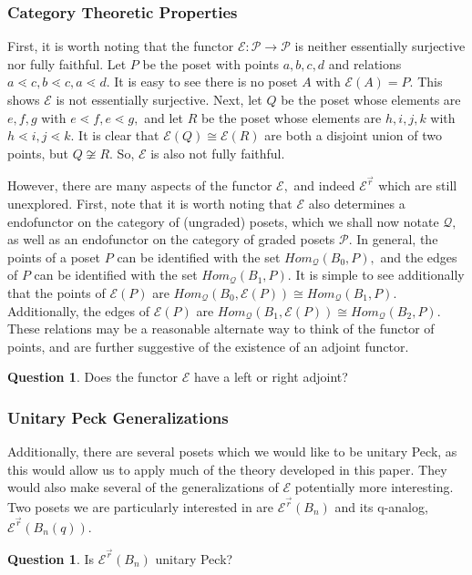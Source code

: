 \documentclass[10 pt]{amsart}
\theoremstyle{plain}
\theoremstyle{definition}
\newtheorem{question}[thm]{Question}
\theoremstyle{remark}
\numberwithin{equation}{section}
\newcommand\sssec{\subsubsection}
\renewcommand{\vec}[1]{\overrightarrow{#1}}
\begin{document}
\sssec{Category Theoretic Properties}

First, it is worth noting that the functor $\mathcal E:\mathcal P \rightarrow \mathcal P$ is neither essentially surjective nor fully faithful. Let $P$ be the poset with points $a,b,c,d$ and relations $a \lessdot c, b \lessdot c, a \lessdot d.$ It is easy to see there is no poset $A$ with $\mathcal E(A) = P.$ This shows $\mathcal E$ is not essentially surjective. Next, let $Q$ be the poset whose elements are $e,f,g$ with $e \lessdot f, e \lessdot g,$ and let $R$ be the poset whose elements are $h,i,j,k$ with $h \lessdot i, j \lessdot k.$ It is clear that $\mathcal E(Q) \cong \mathcal E(R)$ are both a disjoint union of two points, but $Q \not \cong R.$ So, $\mathcal E$ is also not fully faithful.

However, there are many aspects of the functor $\mathcal E,$ and indeed $\mathcal E^{\vec r}$ which are still unexplored. First, note that it is worth noting that $\mathcal E$ also determines a endofunctor on the category of (ungraded) posets, which we shall now notate $\mathcal Q,$ as well as an endofunctor on the category of graded posets $\mathcal P.$ In general, the points of a poset $P$ can be identified with the set $Hom_{\mathcal Q}(B_0,P),$ and the edges of $P$ can be identified with the set $Hom_{\mathcal Q}(B_1,P).$ It is simple to see additionally that the points of $\mathcal E(P)$ are $Hom_{\mathcal Q}(B_0,\mathcal E(P)) \cong Hom_{\mathcal Q}(B_1,P).$ Additionally, the edges of $\mathcal E(P)$ are $Hom_{\mathcal Q}(B_1,\mathcal E(P)) \cong Hom_{\mathcal Q}(B_2,P).$ These relations may be a reasonable alternate way to think of the functor of points, and are further suggestive of the existence of an adjoint functor.

\begin{question}
Does the functor $\mathcal E$ have a left or right adjoint?
\end{question}

\sssec{Unitary Peck Generalizations}

Additionally, there are several posets which we would like to be unitary  
Peck, as this would allow us to apply much of the theory developed in this paper. They would also make several of the generalizations of $\mathcal E$ potentially more interesting. Two posets we are particularly interested in are $\mathcal E^{\vec r}(B_n)$ and its q-analog, $\mathcal E^{\vec r}(B_n(q)).$

\begin{question}
Is $\mathcal E^{\vec r}(B_n)$ unitary Peck?
\end{question}
\end{document}
